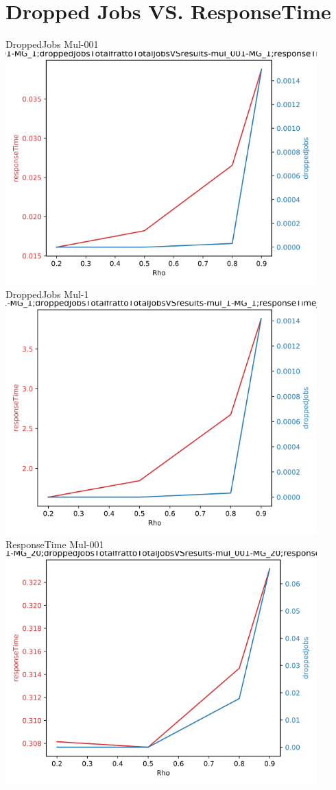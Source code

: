 \documentclass[a4paper]{article}
\begin{document}
\section*{Dropped Jobs VS. ResponseTime}
\begin{center}
DroppedJobs Mul-001 \\
\includegraphics[width=0.9\textwidth]{droppedJobsVSresponseTime-Mul_001-MG_1.png}
DroppedJobs Mul-1 \\
\includegraphics[width=0.9\textwidth]{droppedJobsVSresponseTime-Mul_1-MG_1.png}
\newpage
ResponseTime Mul-001 \\
\includegraphics[width=0.9\textwidth]{droppedJobsVSresponseTime-Mul_001-MG_20.png}

\end{center}
\end{document}
